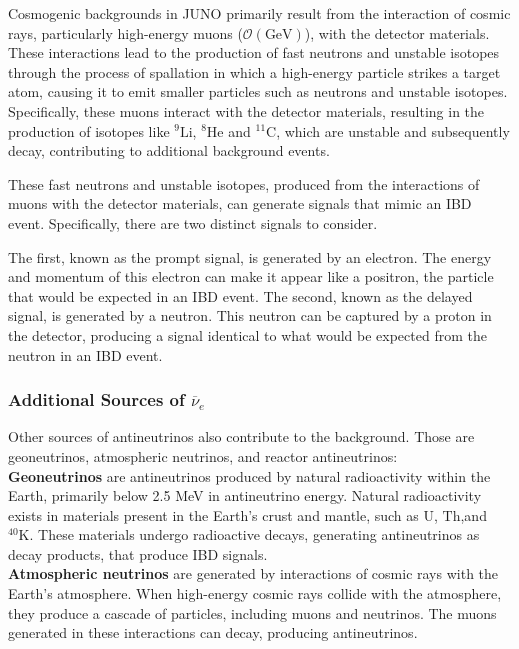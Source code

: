Cosmogenic backgrounds in JUNO primarily result from the interaction of cosmic rays, particularly high-energy muons ($\mathcal{O}(\text{GeV})$), with the detector materials. These interactions lead to the production of fast neutrons and unstable isotopes through the process of spallation in which a high-energy particle strikes a target atom, causing it to emit smaller particles such as neutrons and unstable isotopes. Specifically, these muons interact with the detector materials, resulting in the production of isotopes like  $^{9}\mathrm{Li}$, $^{8}\mathrm{He}$ and $^{11}\mathrm{C}$, which are unstable and subsequently decay, contributing to additional background events.

These fast neutrons and unstable isotopes, produced from the interactions of muons with the detector materials, can generate signals that mimic an IBD event. Specifically, there are two distinct signals to consider.

The first, known as the prompt signal, is generated by an electron. The energy and momentum of this electron can make it appear like a positron, the particle that would be expected in an IBD event. The second, known as the delayed signal, is generated by a neutron. This neutron can be captured by a proton in the detector, producing a signal identical to what would be expected from the neutron in an IBD event.


\subsubsection*{Additional Sources of $\overline{\nu}_e$}

Other sources of antineutrinos also contribute to the background. Those are geoneutrinos, atmospheric neutrinos, and reactor antineutrinos:\\

\textbf{Geoneutrinos} are antineutrinos produced by natural radioactivity within the Earth, primarily below 2.5 MeV in antineutrino energy. Natural radioactivity exists in materials present in the Earth's crust and mantle, such as $\mathrm{U}$, $\mathrm{Th}$,and $^{40}\mathrm{K}$. These materials undergo radioactive decays, generating antineutrinos as decay products, that produce IBD signals.\\

\textbf{Atmospheric neutrinos} are generated by interactions of cosmic rays with the Earth's atmosphere. When high-energy cosmic rays collide with the atmosphere, they produce a cascade of particles, including muons and neutrinos. The muons generated in these interactions can decay, producing antineutrinos.\\

